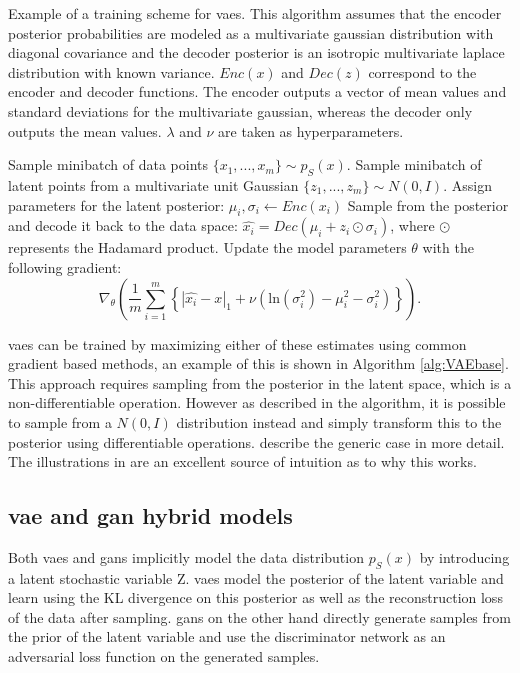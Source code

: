 \begin{algorithm}
    \caption{Example of a training scheme for \acrlong{vaes}. This algorithm assumes that the encoder posterior probabilities are modeled as a multivariate gaussian distribution with diagonal covariance and the decoder posterior is an isotropic multivariate laplace distribution with known variance. $Enc(x)$ and $Dec(z)$ correspond to the encoder and decoder functions. The encoder outputs a vector of mean values and standard deviations for the multivariate gaussian, whereas the decoder only outputs the mean values. $\lambda$ and $\nu$ are taken as hyperparameters.}
    \label{alg:VAEbase}
    \begin{algorithmic}[1]
        \STATE Sample minibatch of data points $\{x_{1}, ..., x_{m}\} \sim p_S(x)$.
        \STATE Sample minibatch of latent points from a multivariate unit Gaussian $\{z_{1}, ..., z_{m}\} \sim N(0, I)$.
        \STATE Assign parameters for the latent posterior: $\mu_i, \sigma_i \leftarrow Enc(x_i)$
        \STATE Sample from the posterior and decode it back to the data space: $\hat{x_i} = Dec(\mu_i + z_i\odot\sigma_i)$, where $\odot$ represents the Hadamard product.
        \STATE Update the model parameters $\theta$ with the following gradient:
        \begin{equation}
            \nonumber
            \nabla_\theta\left(\frac{1}{m}\sum_{i=1}^m\left\{|\hat{x_i} - x|_1 + \nu(\text{ln}(\sigma_i^2) - \mu_i^2 - \sigma_i^2)\right\}\right).
        \end{equation}
        \ENDFOR
    \end{algorithmic}
\end{algorithm}

\acrshort{vaes} can be trained by maximizing either of these estimates using common gradient based methods, an example of this is shown in Algorithm \ref{alg:VAEbase}. This approach requires sampling from the posterior in the latent space, which is a non-differentiable operation. However as described in the algorithm, it is possible to sample from a $N(0, I)$ distribution instead and simply transform this to the posterior using differentiable operations. \textcite{kingma2013auto} describe the generic case in more detail. The illustrations in \parencite{doersch2016tutorial} are an excellent source of intuition as to why this works.

\subsection{\acrshort{vae} and \acrshort{gan} hybrid models}
Both \acrshort{vaes} and \acrshort{gans} implicitly model the data distribution $p_S(x)$ by introducing a latent stochastic variable Z. \acrshort{vaes} model the posterior of the latent variable and learn using the KL divergence on this posterior as well as the reconstruction loss of the data after sampling. \acrshort{gans} on the other hand directly generate samples from the prior of the latent variable and use the discriminator network as an adversarial loss function on the generated samples. 

